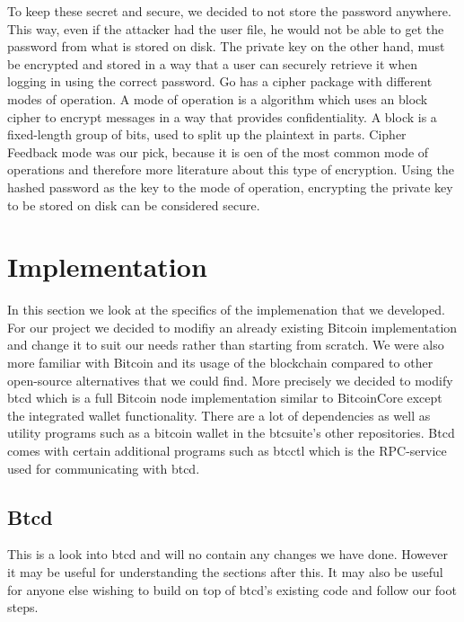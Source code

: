 \documentclass[12pt]{article}
\begin{document}
To keep these secret and secure, we decided to not store the password anywhere. This way, even if the attacker had the user file, he would not be able to get the password from what is stored on disk. The private key on the other hand, must be encrypted and stored in a way that a user can securely retrieve it when logging in using the correct password. Go has a cipher package with different modes of operation. A mode of operation is a algorithm which uses an block cipher to encrypt messages in a way that provides confidentiality\cite{fergusonblock}. A block is a fixed-length group of bits, used to split up the plaintext in parts. Cipher Feedback mode was our pick, because it is oen of the most common mode of operations and therefore more literature about this type of encryption. Using the hashed password as the key to the mode of operation, encrypting the private key to be stored on disk can be considered secure. 

\section{Implementation}
In this section we look at the specifics of the implemenation that we developed. For our project we decided to modifiy an already existing Bitcoin implementation and change it to suit our needs rather than starting from scratch. We were also more familiar with Bitcoin and its usage of the blockchain compared to other open-source alternatives that we could find. More precisely we decided to modify btcd\cite{btcsuite2015} which is a full Bitcoin node implementation similar to BitcoinCore except the integrated wallet functionality. There are a lot of dependencies as well as utility programs such as a bitcoin wallet in the btcsuite's other repositories. Btcd comes with certain additional programs such as btcctl which is the RPC-service used for communicating with btcd. 

\subsection{Btcd}
This is a look into btcd and will no contain any changes we have done. However it may be useful for understanding the sections after this. It may also be useful for anyone else wishing to build on top of btcd's existing code and follow our foot steps.
\end{document}
